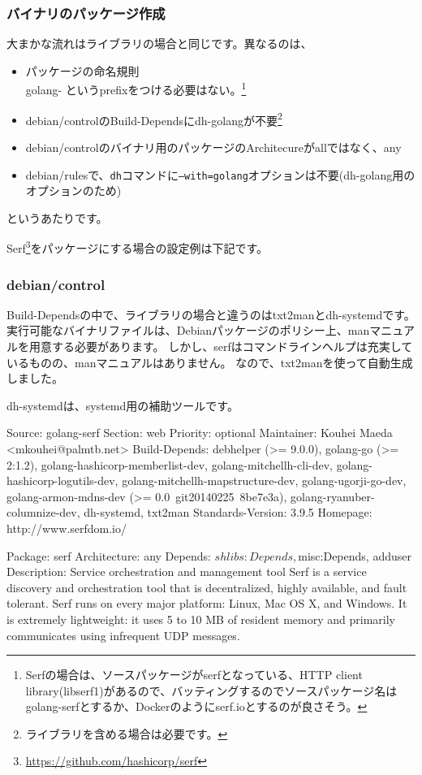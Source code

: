 \documentclass[mingoth,a4paper]{jsarticle}
\begin{document}
\subsubsection{バイナリのパッケージ作成}

大まかな流れはライブラリの場合と同じです。異なるのは、

\begin{itemize}
\item パッケージの命名規則 \\
  golang- というprefixをつける必要はない。\footnote{Serfの場合は、ソースパッケージがserfとなっている、HTTP client library(libserf1)があるので、バッティングするのでソースパッケージ名はgolang-serfとするか、Dockerのようにserf.ioとするのが良さそう。}
\item debian/controlのBuild-Dependsにdh-golangが不要\footnote{ライブラリを含める場合は必要です。}
\item debian/controlのバイナリ用のパッケージのArchitecureがallではなく、any
\item debian/rulesで、\texttt{dh}コマンドに\texttt{--with=golang}オプションは不要(dh-golang用のオプションのため)
\end{itemize}

というあたりです。

Serf\footnote{\url{https://github.com/hashicorp/serf}}をパッケージにする場合の設定例は下記です。

\subsubsection{debian/control}

Build-Dependsの中で、ライブラリの場合と違うのはtxt2manとdh-systemdです。
実行可能なバイナリファイルは、Debianパッケージのポリシー上、manマニュアルを用意する必要があります。
しかし、serfはコマンドラインヘルプは充実しているものの、manマニュアルはありません。
なので、txt2manを使って自動生成しました。

dh-systemdは、systemd用の補助ツールです。

\begin{commandline}
Source: golang-serf
Section: web
Priority: optional
Maintainer: Kouhei Maeda <mkouhei@palmtb.net>
Build-Depends: debhelper (>= 9.0.0),
        golang-go (>= 2:1.2),
        golang-hashicorp-memberlist-dev,
        golang-mitchellh-cli-dev,
        golang-hashicorp-logutils-dev,
        golang-mitchellh-mapstructure-dev,
        golang-ugorji-go-dev,
        golang-armon-mdns-dev (>= 0.0~git20140225~8be7e3a),
        golang-ryanuber-columnize-dev,
        dh-systemd,
        txt2man
Standards-Version: 3.9.5
Homepage: http://www.serfdom.io/

Package: serf
Architecture: any
Depends: ${shlibs:Depends}, ${misc:Depends}, adduser
Description: Service orchestration and management tool
 Serf is a service discovery and orchestration tool that is decentralized,
 highly available, and fault tolerant. Serf runs on every major platform:
 Linux, Mac OS X, and Windows. It is extremely lightweight: it uses 5 to 10 MB
 of resident memory and primarily communicates using infrequent UDP messages.
\end{commandline}
\end{document}
